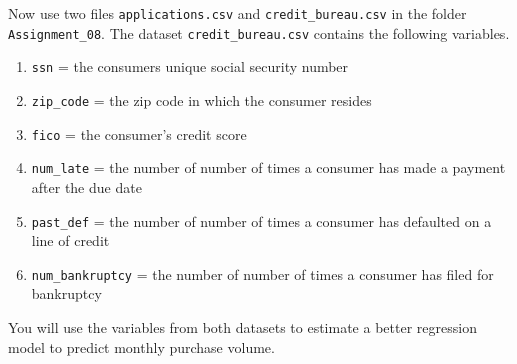 \documentclass[11pt]{exam}
\begin{document}
\begin{questions}

\question Now use two files \texttt{applications.csv} and \texttt{credit\_bureau.csv} in the folder \texttt{Assignment\_08}. The dataset \texttt{credit\_bureau.csv} contains the following variables.

\begin{enumerate}
\item \texttt{ssn} = the consumers unique social security number
\item \texttt{zip\_code} = the zip code in which the consumer resides
\item \texttt{fico} = the consumer's credit score
\item \texttt{num\_late} = the number of number of times a consumer has made a payment after the due date
\item \texttt{past\_def} = the number of number of times a consumer has defaulted on a line of credit
\item \texttt{num\_bankruptcy} = the number of number of times a consumer has filed for bankruptcy
\end{enumerate}

You will use the variables from both datasets to estimate a better regression model to predict monthly purchase volume.

\end{questions}
\end{document}

